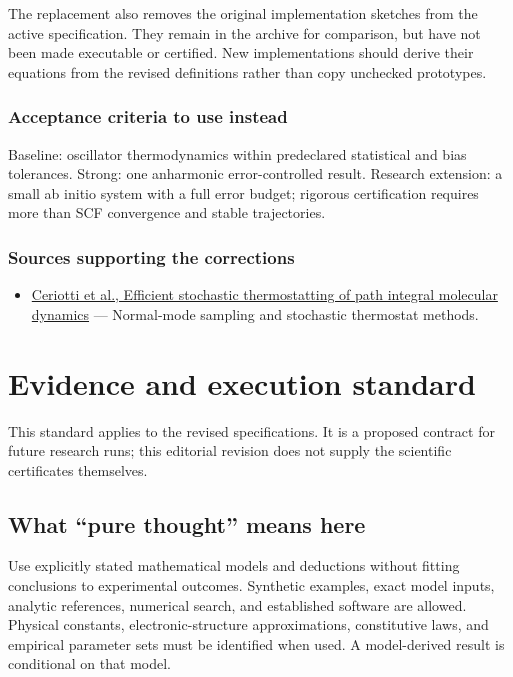 \documentclass[
  11pt,
]{article}
\providecommand{\tightlist}{%
  \setlength{\itemsep}{0pt}\setlength{\parskip}{0pt}}
\begin{document}
The replacement also removes the original implementation sketches from
the active specification. They remain in the archive for comparison, but
have not been made executable or certified. New implementations should
derive their equations from the revised definitions rather than copy
unchecked prototypes.

\subsubsection{Acceptance criteria to use instead}

Baseline: oscillator thermodynamics within predeclared statistical and
bias tolerances. Strong: one anharmonic error-controlled result.
Research extension: a small ab initio system with a full error budget;
rigorous certification requires more than SCF convergence and stable
trajectories.

\subsubsection{Sources supporting the corrections}

\begin{itemize}
\tightlist
\item
  \href{https://arxiv.org/abs/1009.1045}{Ceriotti et al., Efficient
  stochastic thermostatting of path integral molecular dynamics} ---
  Normal-mode sampling and stochastic thermostat methods.
\end{itemize}

\section{Evidence and execution standard}

This standard applies to the revised specifications. It is a proposed
contract for future research runs; this editorial revision does not
supply the scientific certificates themselves.

\subsection{What ``pure thought'' means here}

Use explicitly stated mathematical models and deductions without fitting
conclusions to experimental outcomes. Synthetic examples, exact model
inputs, analytic references, numerical search, and established software
are allowed. Physical constants, electronic-structure approximations,
constitutive laws, and empirical parameter sets must be identified when
used. A model-derived result is conditional on that model.
\end{document}
